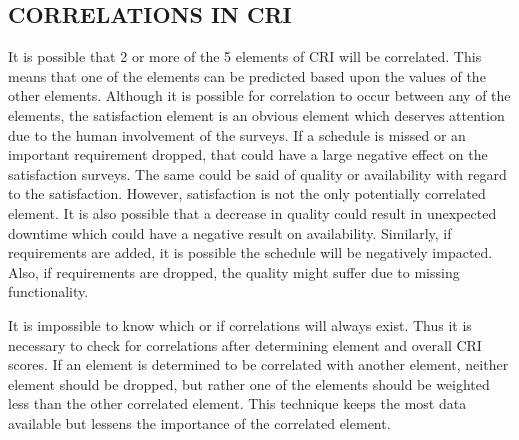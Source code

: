 \documentclass[SDSUThesis.tex]{subfiles}
\begin{document}
    \subsection{CORRELATIONS IN CRI}
        It is possible that 2 or more of the 5 elements of CRI will be correlated.  This means that
        one of the elements can be predicted based upon the values of the other elements.  Although
        it is possible for correlation to occur between any of the elements, the satisfaction element
        is an obvious element which deserves attention due to the human involvement of the surveys. 
        If a schedule is missed or an important requirement dropped, that could have a large negative
        effect on the satisfaction surveys.  The same could be said of quality or availability with regard to 
        the satisfaction.  However, satisfaction is not the only potentially correlated element.  It is also
        possible that a decrease in quality could result in unexpected downtime which could have a
        negative result on availability.  Similarly, if requirements are added, it is possible the schedule
        will be negatively impacted.  Also, if requirements are dropped, the quality might suffer due
        to missing functionality.  
        
        It is impossible to know which or if correlations will always exist.  Thus it is necessary to
        check for correlations after determining element and overall CRI scores.  
        If an element is determined to be correlated with another element, neither element should be dropped,
        but rather one of the elements should be weighted less than
        the other correlated element.  
        This technique keeps the most data available but lessens the importance of
        the correlated element. 
        
\end{document}
